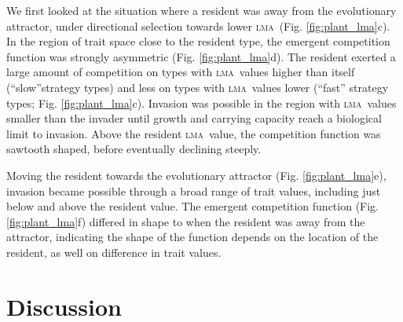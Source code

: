 \documentclass[a4paper,11pt]{article}
\newcommand{\lma}{\textsc{lma}}
\begin{document}
We first looked at the situation where a resident was away from the evolutionary attractor, under directional selection towards lower \lma\ (Fig. \ref{fig:plant_lma}c). In the region of trait space close to the resident type, the emergent competition function was strongly asymmetric (Fig. \ref{fig:plant_lma}d). The resident exerted a large amount of competition on types with \lma\ values higher than itself (``slow''strategy types) and less on types with \lma\ values lower (``fast'' strategy types; Fig. \ref{fig:plant_lma}c). Invasion was possible in the region with \lma\ values smaller than the invader until growth and carrying capacity reach a biological limit to invasion. Above the resident \lma\ value, the competition function was sawtooth shaped, before eventually declining steeply.

Moving the resident towards the evolutionary attractor (Fig. \ref{fig:plant_lma}e), invasion became possible through a broad range of trait values, including just below and above the resident value. The emergent competition function (Fig. \ref{fig:plant_lma}f) differed in shape to when the resident was away from the attractor, indicating the shape of the function depends on the location of the resident, as well on difference in trait values.

\section{Discussion}
\end{document}
